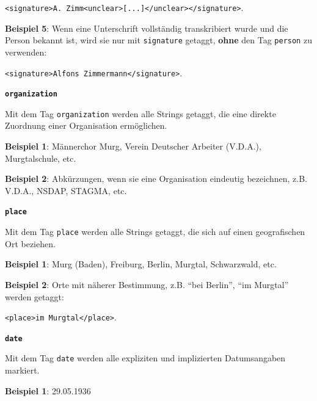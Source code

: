 \documentclass[12pt, a4paper, ngerman, bidi=default]{article}
\begin{document}
\begin{description}
\begin{description}
    \colorbox{VeryLightGray}{\texttt{\textless signature\textgreater A. Zimm\textless unclear\textgreater [...]\textless /unclear\textgreater\textless /signature\textgreater}.} 
    
    \textbf{ Beispiel 5}: Wenn eine Unterschrift vollständig transkribiert wurde und die Person bekannt ist, wird sie nur mit \texttt{\colorbox{signature}{signature}} getaggt, \textbf{ohne} den Tag \texttt{\colorbox{person}{person}} zu verwenden:  

    \colorbox{VeryLightGray}{\texttt{\textless signature\textgreater Alfons Zimmermann\textless /signature\textgreater}.} 
    
    \item\texttt{\textbf{{\colorbox{organization}{organization}}}}
        
    Mit dem Tag \texttt{\colorbox{organization}{organization}} werden alle Strings getaggt, die eine direkte Zuordnung einer Organisation ermöglichen.  
    
    \noindent \textbf{ Beispiel 1}: Männerchor Murg, Verein Deutscher Arbeiter (V.D.A.), Murgtalschule, etc.

    \textbf{ Beispiel 2}: Abkürzungen, wenn sie eine Organisation eindeutig bezeichnen, z.B. V.D.A., NSDAP, STAGMA, etc.
    

    \item\texttt{\textbf{{\colorbox{place}{place}}}}
        
    Mit dem Tag \texttt{\colorbox{place}{place}} werden alle Strings getaggt, die sich auf einen geografischen Ort beziehen.  
    
    \noindent \textbf{ Beispiel 1}: Murg (Baden), Freiburg, Berlin, Murgtal, Schwarzwald, etc.

    \textbf{ Beispiel 2}: Orte mit näherer Bestimmung, z.B. \enquote{bei Berlin}, \enquote{im Murgtal} werden getaggt:  

    \colorbox{VeryLightGray}{\texttt{\textless place\textgreater im Murgtal\textless /place\textgreater}.} 

    
    \item\texttt{\textbf{{\colorbox{date}{date}}}}
        
    Mit dem Tag \texttt{\colorbox{date}{date}} werden alle expliziten und implizierten Datumsangaben markiert.  
    
    \noindent \textbf{ Beispiel 1}:  29.05.1936


\end{description}
\end{description}
\end{document}

